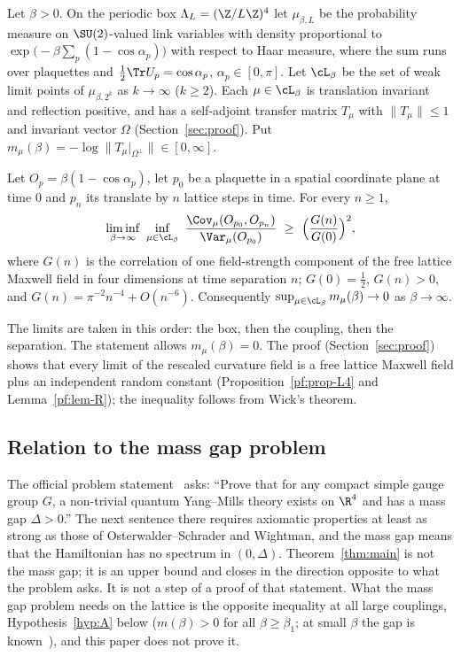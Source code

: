 Let $\beta>0$. On the periodic box $\Lambda_L=(\Z/L\Z)^4$ let $\mu_{\beta,L}$ be the probability measure on $\SU(2)$-valued link variables with density proportional to $\exp\bigl(-\beta\sum_p(1-\cos\alpha_p)\bigr)$ with respect to Haar measure, where the sum runs over plaquettes and $\tfrac12\Tr U_p=\cos\alpha_p$, $\alpha_p\in[0,\pi]$. Let $\cL_\beta$ be the set of weak limit points of $\mu_{\beta,2^k}$ as $k\to\infty$ ($k\ge2$). Each $\mu\in\cL_\beta$ is translation invariant and reflection positive, and has a self-adjoint transfer matrix $T_\mu$ with $\|T_\mu\|\le 1$ and invariant vector $\Omega$ (Section~\ref{sec:proof}). Put $m_\mu(\beta)=-\log\|T_\mu|_{\Omega^\perp}\|\in[0,\infty]$.

\begin{theorem}\label{thm:main}
Let $O_p=\beta(1-\cos\alpha_p)$, let $p_0$ be a plaquette in a spatial coordinate plane at time $0$ and $p_n$ its translate by $n$ lattice steps in time. For every $n\ge 1$,
\[
\liminf_{\beta\to\infty}\ \inf_{\mu\in\cL_\beta}\ \frac{\Cov_\mu(O_{p_0},O_{p_n})}{\Var_\mu(O_{p_0})}\ \ge\ \Bigl(\frac{G(n)}{G(0)}\Bigr)^{2},
\]
where $G(n)$ is the correlation of one field-strength component of the free lattice Maxwell field in four dimensions at time separation $n$; $G(0)=\tfrac12$, $G(n)>0$, and $G(n)=\pi^{-2}n^{-4}+O(n^{-6})$. Consequently $\sup_{\mu\in\cL_\beta}m_\mu(\beta)\to 0$ as $\beta\to\infty$.
\end{theorem}

The limits are taken in this order: the box, then the coupling, then the separation. The statement allows $m_\mu(\beta)=0$. The proof (Section~\ref{sec:proof}) shows that every limit of the rescaled curvature field is a free lattice Maxwell field plus an independent random constant (Proposition~\ref{pf:prop-L4} and Lemma~\ref{pf:lem-R}); the inequality follows from Wick's theorem.

\subsection*{Relation to the mass gap problem}
The official problem statement~\cite[p.~6]{JW} asks: ``Prove that for any compact simple gauge group $G$, a non-trivial quantum Yang--Mills theory exists on $\R^4$ and has a mass gap $\Delta>0$.'' The next sentence there requires axiomatic properties at least as strong as those of Osterwalder--Schrader and Wightman, and the mass gap means that the Hamiltonian has no spectrum in $(0,\Delta)$. Theorem~\ref{thm:main} is not the mass gap; it is an upper bound and closes in the direction opposite to what the problem asks. It is not a step of a proof of that statement. What the mass gap problem needs on the lattice is the opposite inequality at all large couplings, Hypothesis~\ref{hyp:A} below ($m(\beta)>0$ for all $\beta\ge\beta_1$; at small $\beta$ the gap is known~\cite{OS78}), and this paper does not prove it.

